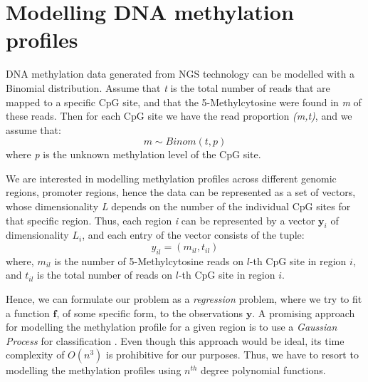 \section{Modelling DNA methylation profiles} \label{model-meth-profiles-s}
DNA methylation data generated from NGS technology can be modelled with a Binomial distribution. Assume that \emph{t} is the total number of reads that are mapped to a specific CpG site, and that the 5-Methylcytosine were found in \emph{m} of these reads. Then for each CpG site we have the read proportion \emph{(m,t)}, and we assume that:
\begin{equation} \label{binom-1d-f-meth}
	m \sim Binom(t, p)
\end{equation}
where \emph{p} is the unknown methylation level of the CpG site.

We are interested in modelling methylation profiles across different genomic regions, \eg promoter regions, hence the data can be represented as a set of vectors, whose dimensionality \emph{L} depends on the number of the individual CpG sites for that specific region. Thus, each region \emph{i} can be represented by a vector $\mathbf{y}_{i}$ of dimensionality $L_{i}$, and each entry of the vector consists of the tuple:
\begin{equation}
	y_{il} = (m_{il},t_{il})
\end{equation}
where, $m_{il}$ is the number of 5-Methylcytosine reads on $l$-th CpG site in region $i$, and $t_{il}$ is the total number of reads on $l$-th CpG site in region $i$. 

Hence, we can formulate our problem as a \emph{regression} problem, where we try to fit a function $\mathbf{f}$, of some specific form, to the observations $\mathbf{y}$. A promising approach for modelling the methylation profile for a given region is to use a \emph{Gaussian Process} for classification \citep{Rasmussen2006}. Even though this approach would be ideal, its time complexity of $O(n^{3})$ is prohibitive for our purposes. Thus, we have to resort to modelling the methylation profiles using $n^{th}$ degree polynomial functions.

